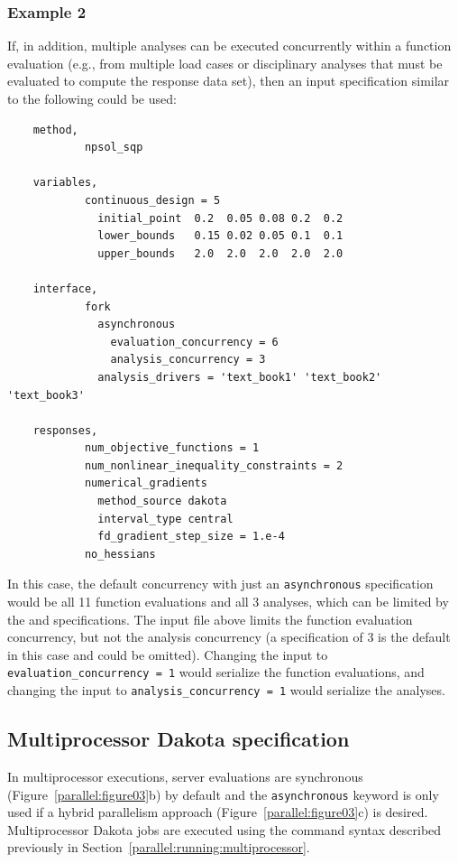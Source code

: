 \subsubsection{Example 2}\label{parallel:spec:single:example2}

If, in addition, multiple analyses can be executed concurrently within
a function evaluation (e.g., from multiple load cases or disciplinary
analyses that must be evaluated to compute the response data set),
then an input specification similar to the following could be used:
\begin{small}
\begin{verbatim}
    method,
            npsol_sqp

    variables,
            continuous_design = 5
              initial_point  0.2  0.05 0.08 0.2  0.2
              lower_bounds   0.15 0.02 0.05 0.1  0.1
              upper_bounds   2.0  2.0  2.0  2.0  2.0

    interface,
            fork
              asynchronous
                evaluation_concurrency = 6
                analysis_concurrency = 3
              analysis_drivers = 'text_book1' 'text_book2' 'text_book3'

    responses,
            num_objective_functions = 1
            num_nonlinear_inequality_constraints = 2
            numerical_gradients
              method_source dakota
              interval_type central
              fd_gradient_step_size = 1.e-4
            no_hessians
\end{verbatim}
\end{small}

In this case, the default concurrency with just an
\texttt{asynchronous} specification would be all 11 function
evaluations and all 3 analyses, which can be limited by the
 and 
specifications. The input file above limits the function evaluation
concurrency, but not the analysis concurrency (a specification of 3 is
the default in this case and could be omitted). Changing the input to
\texttt{evaluation\_concurrency = 1} would serialize the function
evaluations, and changing the input to \texttt{analysis\_concurrency = 1}
would serialize the analyses.

\subsection{Multiprocessor Dakota specification}\label{parallel:spec:multi}

In multiprocessor executions, server evaluations are synchronous
(Figure~\ref{parallel:figure03}b) by default and the
\texttt{asynchronous} keyword is only used if a hybrid parallelism
approach (Figure~\ref{parallel:figure03}c) is desired. Multiprocessor
Dakota jobs are executed using the command syntax described previously
in Section~\ref{parallel:running:multiprocessor}.


